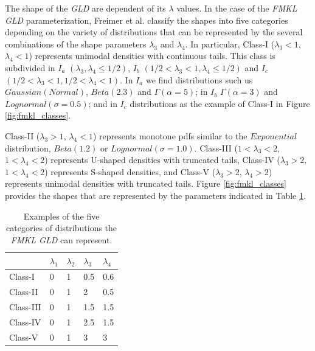The shape of the \textit{GLD} are dependent of its $\lambda$ values. In the case of the \textit{FMKL GLD} parameterization, Freimer et al. \cite{Freimer1988} classify the shapes into five categories depending on the variety of distributions that can be represented by the several combinations of the shape parameters $\lambda_{3}$ and $\lambda_{4}$. In particular, Class-I ($\lambda_{3} < 1$, $\lambda_{4}<1$) represents unimodal densities with continuous tails. This class is subdivided in $I_{a}$ $(\lambda_{3}, \lambda_{4} \leq 1/2)$, $I_{b}$ $(1/2 < \lambda_{3} < 1, \lambda_{4} \leq 1/2)$ and $I_{c}$ $(1/2 < \lambda_{3} < 1, 1/2 < \lambda_{4} < 1)$. In $I_{a}$ we find distributions such us $Gaussian (Normal)$, $Beta(2.3)$ and $\Gamma(\alpha = 5)$; in $I_{b}$ $\Gamma(\alpha = 3)$ and $Lognormal(\sigma=0.5)$; and in $I_{c}$ distributions as the example of Class-I in Figure \ref{fig:fmkl_classes}.  

Class-II ($\lambda_{3}>1$, $\lambda_{4}<1$) represents monotone pdfs similar to the $Exponential$ distribution, $Beta(1.2)$ or $Lognormal(\sigma=1.0)$. Class-III ($1<\lambda_{3}<2$, $1<\lambda_{4}<2$) represents U-shaped densities with truncated tails, Class-IV ($\lambda_{3}>2$, $1<\lambda_{4}<2$) represents S-shaped densities, and Class-V ($\lambda_{3}>2$, $\lambda_{4}>2$) represents unimodal densities with truncated tails. Figure \ref{fig:fmkl_classes} provides the shapes that are represented by the parameters indicated in Table \ref{tab:fmkl_classes}.

\begin{table}[H]
\centering
\caption{Examples of the five categories of distributions the \textit{FMKL GLD} can represent.}
\label{tab:fmkl_classes}
\begin{tabular}{lllll}
\hline
          & $\lambda_{1}$ & $\lambda_{2}$ & $\lambda_{3}$ & $\lambda_{4}$ \\ \hline
Class-I   & 0             & 1             & 0.5           & 0.6           \\
Class-II  & 0             & 1             & 2             & 0.5           \\
Class-III & 0             & 1             & 1.5           & 1.5           \\
Class-IV  & 0             & 1             & 2.5           & 1.5           \\
Class-V   & 0             & 1             & 3             & 3             \\ \hline
\end{tabular}
\end{table}

